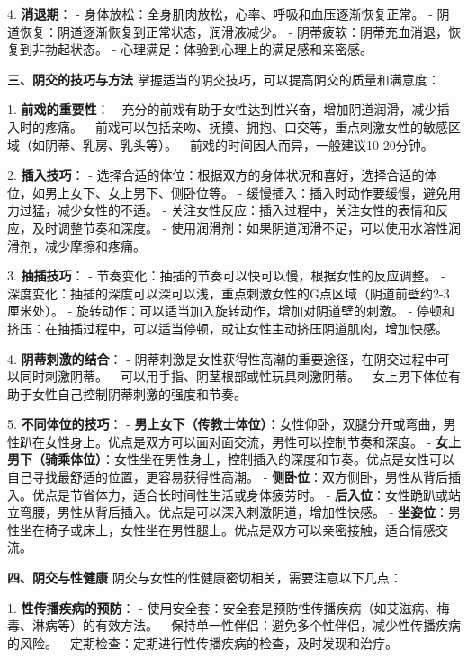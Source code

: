 \begin{enumerate}
  4. \textbf{消退期}：
     - 身体放松：全身肌肉放松，心率、呼吸和血压逐渐恢复正常。
     - 阴道恢复：阴道逐渐恢复到正常状态，润滑液减少。
     - 阴蒂疲软：阴蒂充血消退，恢复到非勃起状态。
     - 心理满足：体验到心理上的满足感和亲密感。

  \textbf{三、阴交的技巧与方法}
  掌握适当的阴交技巧，可以提高阴交的质量和满意度：

  1. \textbf{前戏的重要性}：
     - 充分的前戏有助于女性达到性兴奋，增加阴道润滑，减少插入时的疼痛。
     - 前戏可以包括亲吻、抚摸、拥抱、口交等，重点刺激女性的敏感区域（如阴蒂、乳房、乳头等）。
     - 前戏的时间因人而异，一般建议10-20分钟。

  2. \textbf{插入技巧}：
     - 选择合适的体位：根据双方的身体状况和喜好，选择合适的体位，如男上女下、女上男下、侧卧位等。
     - 缓慢插入：插入时动作要缓慢，避免用力过猛，减少女性的不适。
     - 关注女性反应：插入过程中，关注女性的表情和反应，及时调整节奏和深度。
     - 使用润滑剂：如果阴道润滑不足，可以使用水溶性润滑剂，减少摩擦和疼痛。

  3. \textbf{抽插技巧}：
     - 节奏变化：抽插的节奏可以快可以慢，根据女性的反应调整。
     - 深度变化：抽插的深度可以深可以浅，重点刺激女性的G点区域（阴道前壁约2-3厘米处）。
     - 旋转动作：可以适当加入旋转动作，增加对阴道壁的刺激。
     - 停顿和挤压：在抽插过程中，可以适当停顿，或让女性主动挤压阴道肌肉，增加快感。

  4. \textbf{阴蒂刺激的结合}：
     - 阴蒂刺激是女性获得性高潮的重要途径，在阴交过程中可以同时刺激阴蒂。
     - 可以用手指、阴茎根部或性玩具刺激阴蒂。
     - 女上男下体位有助于女性自己控制阴蒂刺激的强度和节奏。

  5. \textbf{不同体位的技巧}：
     - \textbf{男上女下（传教士体位）}：女性仰卧，双腿分开或弯曲，男性趴在女性身上。优点是双方可以面对面交流，男性可以控制节奏和深度。
     - \textbf{女上男下（骑乘体位）}：女性坐在男性身上，控制插入的深度和节奏。优点是女性可以自己寻找最舒适的位置，更容易获得性高潮。
     - \textbf{侧卧位}：双方侧卧，男性从背后插入。优点是节省体力，适合长时间性生活或身体疲劳时。
     - \textbf{后入位}：女性跪趴或站立弯腰，男性从背后插入。优点是可以深入刺激阴道，增加性快感。
     - \textbf{坐姿位}：男性坐在椅子或床上，女性坐在男性腿上。优点是双方可以亲密接触，适合情感交流。

  \textbf{四、阴交与性健康}
  阴交与女性的性健康密切相关，需要注意以下几点：

  1. \textbf{性传播疾病的预防}：
     - 使用安全套：安全套是预防性传播疾病（如艾滋病、梅毒、淋病等）的有效方法。
     - 保持单一性伴侣：避免多个性伴侣，减少性传播疾病的风险。
     - 定期检查：定期进行性传播疾病的检查，及时发现和治疗。


\end{enumerate}
